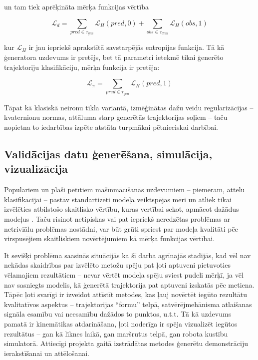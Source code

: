\documentclass[12pt, a4paper]{article}
\numberwithin{equation}{section} %
\begin{document}
un tam tiek aprēķināta mērķa funkcijas vērtība 

\begin{equation}
    \mathcal{L}_{d} = \sum_{pred \in \tau_{gen}} \mathcal{L}_H(pred,0) + 
    \sum_{obs \in \tau_{dem}} \mathcal{L}_H(obs,1) 
\end{equation}

kur $\mathcal{L}_H$ ir jau iepriekš aprakstītā savstarpējās entropijas funkcija. Tā kā ģeneratora uzdevums ir pretējs, bet tā parametri ietekmē tikai ģenerēto trajektoriju klasifikāciju, mērķa funkcija ir pretēja:

\begin{equation}
    \mathcal{L}_{\pi} = \sum_{pred \in \tau_{gen}} \mathcal{L}_H(pred,1) 
\end{equation}

Tāpat kā klasiskā neironu tīkla variantā, izmēģinātas dažu veidu regularizācijas -- kvaternionu normas, attāluma starp ģenerētās trajektorijas soļiem -- taču nopietna to iedarbības izpēte atstāta turpmākai pētnieciskai darbībai.

\subsection{Validācijas datu ģenerēšana, simulācija, vizualizācija}

Populāriem un plaši pētītiem mašīnmācīšanās uzdevumiem -- piemēram, attēlu klasifikācijai -- pastāv standartizēti modeļa veiktspējas mēri un atliek tikai izvēlēties atbilstošo skaitlisko vērtību, kuras vertībai sekot, apmācot dažādus modeļus \cite{tf_img_tutorial}. Taču risinot netipiskas vai pat iepriekš neredzētas problēmas ar netriviālu problēmas nostādni, var būt grūti spriest par modeļa kvalitāti pēc virspusējiem skaitliskiem novērtējumiem kā mērķa funkcijas vērtībai. 

It sevišķi problēma saasinās situācijās ka šī darba agrīnajās stadijās, kad vēl nav nekādas skaidrības par izvēlēto metožu spēju pat ļoti aptuveni pietuvoties vēlamajiem rezultātiem -- nevar vērtēt modeļa spēju sviest pudeli mērķī, ja vēl nav sasniegts modelis, kā ģenerētā trajektorija pat aptuveni izskatās pēc metiena. Tāpēc ļoti svarīgi ir izveidot attīstīt metodes, kas ļauj novērtēt iegūto rezultātu kvalitatīvos aspektus -- trajektorijas ``formu'' telpā, satvērējmehānisma atlaišanas signāla esamību vai neesamību dažādos to punktos, u.t.t. Tā kā uzdevums pamatā ir kinemātikas atdarināšana, ļoti noderīga ir spēja vizualizēt iegūtos rezultātus -- gan kā līknes laikā, gan maršrutus telpā, gan robota kustību simulatorā. Attiecīgi projekta gaitā izstrādātas metodes ģenerētu demonstrāciju ierakstīšanai un attēlošanai.
\end{document}
